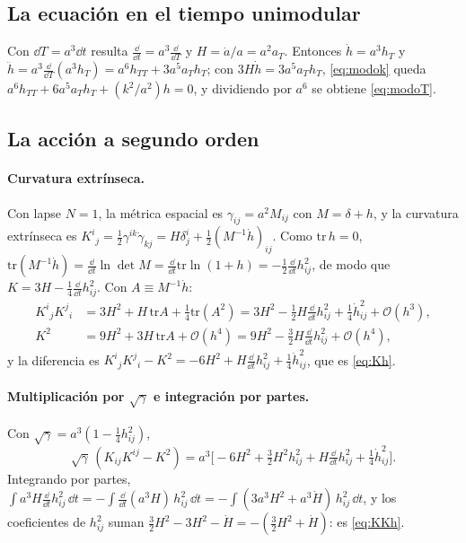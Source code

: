 \subsection{La ecuación en el tiempo unimodular}

Con $\dd T=a^3\dd t$ resulta $\tfrac{\dd}{\dd t}=a^3\tfrac{\dd}{\dd T}$ y $H=\dot a/a=a^2a_T$. Entonces $\dot h=a^3h_T$ y $\ddot h=a^3\tfrac{\dd}{\dd T}(a^3h_T)=a^6h_{TT}+3a^5a_Th_T$; con $3H\dot h=3a^5a_Th_T$, \eqref{eq:modok} queda $a^6h_{TT}+6a^5a_Th_T+(k^2/a^2)h=0$, y dividiendo por $a^6$ se obtiene \eqref{eq:modoT}.

\subsection{La acción a segundo orden}

\paragraph{Curvatura extrínseca.} Con lapse $N=1$, la métrica espacial es $\gamma_{ij}=a^2M_{ij}$ con $M=\delta+h$, y la curvatura extrínseca es $K^i{}_j=\tfrac12\gamma^{ik}\dot\gamma_{kj}=H\delta^i_j+\tfrac12(M^{-1}\dot h)_{ij}$. Como $\mathrm{tr}\,h=0$, $\mathrm{tr}(M^{-1}\dot h)=\tfrac{\dd}{\dd t}\ln\det M=\tfrac{\dd}{\dd t}\mathrm{tr}\ln(1+h)=-\tfrac12\tfrac{\dd}{\dd t}h_{ij}^2$, de modo que $K=3H-\tfrac14\tfrac{\dd}{\dd t}h_{ij}^2$. Con $A\equiv M^{-1}\dot h$:
\begin{align}
K^i{}_jK^j{}_i&=3H^2+H\,\mathrm{tr}A+\tfrac14\mathrm{tr}(A^2)=3H^2-\tfrac12H\tfrac{\dd}{\dd t}h_{ij}^2+\tfrac14\dot h_{ij}^2+\mathcal O(h^3),\\
K^2&=9H^2+3H\,\mathrm{tr}A+\mathcal O(h^4)=9H^2-\tfrac32H\tfrac{\dd}{\dd t}h_{ij}^2+\mathcal O(h^4),
\end{align}
y la diferencia es $K^i{}_jK^j{}_i-K^2=-6H^2+H\tfrac{\dd}{\dd t}h_{ij}^2+\tfrac14\dot h_{ij}^2$, que es \eqref{eq:Kh}.

\paragraph{Multiplicación por $\sqrt\gamma$ e integración por partes.} Con $\sqrt\gamma=a^3(1-\tfrac14h_{ij}^2)$,
\begin{equation}
\sqrt\gamma\,(K_{ij}K^{ij}-K^2)=a^3\Big[-6H^2+\tfrac32H^2h_{ij}^2+H\tfrac{\dd}{\dd t}h_{ij}^2+\tfrac14\dot h_{ij}^2\Big].
\end{equation}
Integrando por partes, $\int a^3H\tfrac{\dd}{\dd t}h_{ij}^2\,\dd t=-\int\tfrac{\dd}{\dd t}(a^3H)\,h_{ij}^2\,\dd t=-\int(3a^3H^2+a^3\dot H)\,h_{ij}^2\,\dd t$, y los coeficientes de $h_{ij}^2$ suman $\tfrac32H^2-3H^2-\dot H=-(\tfrac32H^2+\dot H)$: es \eqref{eq:KKh}.

